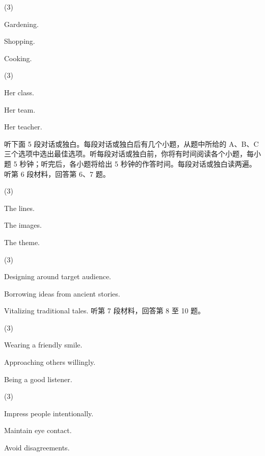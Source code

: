 \documentclass{英语试卷}
\begin{document}
\begin{choices}(3)
  \item Gardening.
  \item Shopping.
  \item Cooking.
\end{choices}
\begin{choices}(3)
  \item Her class.
  \item Her team.
  \item Her teacher.
\end{choices}
\par 听下面 5 段对话或独白。每段对话或独白后有几个小题，从题中所给的 A、B、C 三个选项中选出最佳选项。听每段对话或独白前，你将有时间阅读各个小题，每小题 5 秒钟；听完后，各小题将给出 5 秒钟的作答时间。每段对话或独白读两遍。 听第 6 段材料，回答第 6、7 题。\par
{}
\begin{choices}(3)
  \item The lines.
  \item The images.
  \item The theme.
\end{choices}
\begin{choices}(3)
  \item Designing around target audience.
  \item Borrowing ideas from ancient stories.
  \item Vitalizing traditional tales. 听第 7 段材料，回答第 8 至 10 题。
\end{choices}
\begin{choices}(3)
  \item Wearing a friendly smile.
  \item Approaching others willingly.
  \item Being a good listener.
\end{choices}
\begin{choices}(3)
  \item Impress people intentionally.
  \item Maintain eye contact.
  \item Avoid disagreements.
\end{choices}
\end{document}
